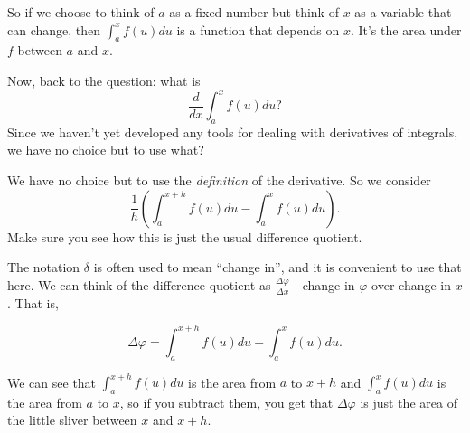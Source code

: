 \documentclass[11pt]{book}
\numberwithin{example}{chapter}
\begin{document}
So if we choose to think of $a$ as a fixed number but think of $x$ as a variable that can change, then $\int_a^x f(u) du$ is a function that depends on $x$.  It's the area under $f$ between $a$ and $x$.

Now, back to the question: what is $$\frac{d}{dx}\int_a^x f(u) du?$$
Since we haven't yet developed any tools for dealing with derivatives of integrals, we have no choice but to use what?  



\begin{center}
\end{center}

We have no choice but to use the \emph{definition} of the derivative.  So we consider
$$\frac{1}{h}\left(\int_a^{x+h} f(u) du - \int_a^x f(u) du\right).$$
Make sure you see how this is just the usual difference quotient.

The notation $\delta$ is often used to mean ``change in'', and it is convenient to use that here.  We can think of the difference quotient as $\frac{\Delta \varphi}{\Delta x}$---change in $\varphi$ over change in $x$.  That is, 

$$\Delta \varphi = \int_a^{x+h} f(u) du - \int_a^x f(u) du.$$

We can see that $\int_a^{x+h} f(u) du$ is the area from $a$ to $x+h$ and $\int_a^{x} f(u) du$ is the area from $a$ to $x$, so if you subtract them, you get that $\Delta \varphi$ is just the area of the little sliver between $x$ and $x+h$.
\end{document}
